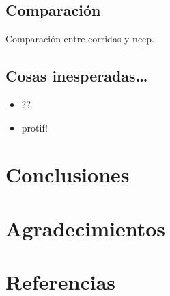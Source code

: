 \documentclass[spanish,a4paper]{book}
\providecommand{\tightlist}{%
  \setlength{\itemsep}{0pt}\setlength{\parskip}{0pt}}
\begin{document}
\section{Comparación}\label{comparacion}

Comparación entre corridas y ncep.

\section{Cosas inesperadas\ldots{}}\label{cosas-inesperadas}

\begin{itemize}
\tightlist
\item
  ??
\item
  protif!
\end{itemize}

\chapter{Conclusiones}\label{conclusiones}

\chapter{Agradecimientos}\label{agradecimientos}

\chapter{Referencias}\label{referencias}
\end{document}
